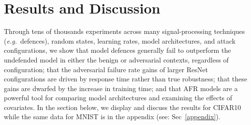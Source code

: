 \section{Results and Discussion}
\label{results}

Through tens of thousands experiments across many signal-processing techniques (\textit{e.g.}~defences), random states, learning rates, model architectures, and attack configurations, we show that model defences generally fail to outperform the undefended model in either the benign or adversarial contexts, regardless of configuration; that the adversarial failure rate gains of larger ResNet configurations are driven by response time rather than true robustness; that these gains are dwarfed by the increase in training time; and that AFR models are a powerful tool for comparing model architectures and examining the effects of covariates. In the section below, we display and discuss the results for CIFAR10 while the same data for MNIST is in the appendix (see: Sec~\ref{appendix}).

